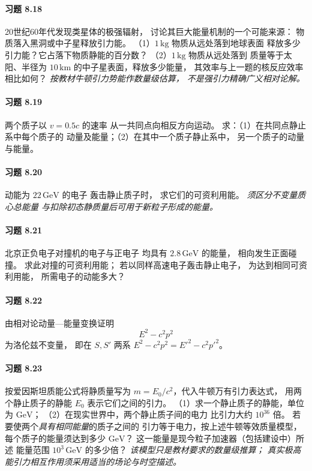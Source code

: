 \paragraph{习题 8.18}
20世纪60年代发现类星体的极强辐射，
讨论其巨大能量机制的一个可能来源：
物质落入黑洞或中子星释放引力能。
（1）\(1\,\mathrm{kg}\) 物质从远处落到地球表面
释放多少引力能？它占落下物质静能的百分数？
（2）\(1\,\mathrm{kg}\) 物质从远处落到
质量等于太阳、半径为 \(10\,\mathrm{km}\)
的中子星表面，释放多少能量，
其效率与上一题的核反应效率相比如何？
\textit{按教材牛顿引力势能作数量级估算，
不是强引力精确广义相对论解。}

\paragraph{习题 8.19}
两个质子以 \(v=0.5c\) 的速率
从一共同点向相反方向运动。
求：（1）在共同点静止系中每个质子的
动量及能量；（2）在其中一个质子静止系中，
另一个质子的动量与能量。

\paragraph{习题 8.20}
动能为 \(22\,\mathrm{GeV}\) 的电子
轰击静止质子时，
求它们的可资利用能。
\textit{须区分不变量质心总能量
与扣除初态静质量后可用于新粒子形成的能量。}

\paragraph{习题 8.21}
北京正负电子对撞机的电子与正电子
均具有 \(2.8\,\mathrm{GeV}\) 的能量，
相向发生正面碰撞。
求此对撞的可资利用能；
若以同样高速电子轰击静止电子，
为达到相同可资利用能，
所需电子的动能多大？

\paragraph{习题 8.22}
由相对论动量—能量变换证明
\[
 \boxed{E^2-c^2p^2}
\]
为洛伦兹不变量，
即在 \(S,S'\) 两系
\(E^2-c^2p^2=E'^2-c^2p'^2\)。

\paragraph{习题 8.23}
按爱因斯坦质能公式将静质量写为
\(m=E_0/c^2\)，代入牛顿万有引力表达式，
用两个静止质子的静能 \(E_0\) 表示它们之间的引力。
（1）求一个静止质子的静能，单位为 \(\mathrm{GeV}\)；
（2）在现实世界中，两个静止质子间的电力
比引力大约 \(10^{36}\) 倍。
若要使两个\emph{具有相同能量}的质子之间的
引力等于电力，按上述牛顿等效质量模型，
每个质子的能量须达到多少 \(\mathrm{GeV}\)？
这一能量是现今粒子加速器（包括建设中）所述
能量范围 \(10^3\,\mathrm{GeV}\) 的多少倍？
\textit{该模型只是教材要求的数量级推算；
真实极高能引力相互作用须采用适当的场论与时空描述。}
